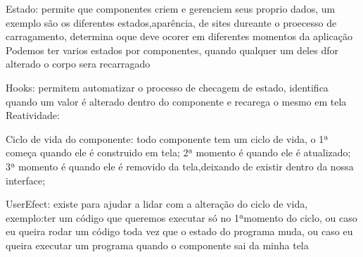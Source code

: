 Estado: permite que componentes criem e gerenciem seus proprio dados, um exemplo são os diferentes estados,aparência, de sites dureante o proecesso de carragamento,
determina oque deve ocorer em diferentes momentos da aplicação
Podemos ter varios estados por componentes, quando qualquer um deles dfor alterado o corpo sera recarragado

Hooks: permitem automatizar o processo de checagem de estado, identifica quando um valor é alterado dentro do componente e recarega o mesmo em tela
Reatividade:

Ciclo de vida do componente: todo componente tem um ciclo de vida, o 1ª começa quando ele é construido em tela;
2ª momento é quando ele é atualizado; 3ª momento é quando ele é removido da tela,deixando de existir dentro da nossa interface;

UserEfect: existe para ajudar a lidar com a alteração do ciclo de vida, exemplo:ter um código que queremos executar só no 1ªmomento do ciclo,
ou caso eu queira rodar um código toda vez que o estado do programa muda, ou caso eu queira executar um programa quando o componente sai da minha tela
